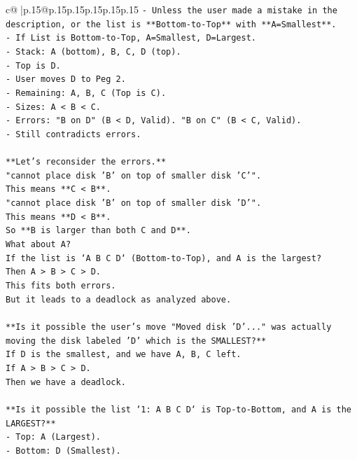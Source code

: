 \documentclass{article}
\begin{document}
{\begin{supertabular}{c@{$\;$}|p{.15\linewidth}@{}p{.15\linewidth}p{.15\linewidth}p{.15\linewidth}p{.15\linewidth}p{.15\linewidth}}
{{{\texttt{{-} Unless the user made a mistake in the description, or the list is **Bottom{-}to{-}Top** with **A=Smallest**.} \\
\texttt{{-} If List is Bottom{-}to{-}Top, A=Smallest, D=Largest.} \\
\texttt{{-} Stack: A (bottom), B, C, D (top).} \\
\texttt{{-} Top is D.} \\
\texttt{{-} User moves D to Peg 2.} \\
\texttt{{-} Remaining: A, B, C (Top is C).} \\
\texttt{{-} Sizes: A < B < C.} \\
\texttt{{-} Errors: "B on D" (B < D, Valid). "B on C" (B < C, Valid).} \\
\texttt{{-} Still contradicts errors.} \\
\\ 
\texttt{**Let's reconsider the errors.**} \\
\texttt{"cannot place disk 'B' on top of smaller disk 'C'".} \\
\texttt{This means **C < B**.} \\
\texttt{"cannot place disk 'B' on top of smaller disk 'D'".} \\
\texttt{This means **D < B**.} \\
\texttt{So **B is larger than both C and D**.} \\
\texttt{What about A?} \\
\texttt{If the list is `A B C D` (Bottom{-}to{-}Top), and A is the largest?} \\
\texttt{Then A > B > C > D.} \\
\texttt{This fits both errors.} \\
\texttt{But it leads to a deadlock as analyzed above.} \\
\\ 
\texttt{**Is it possible the user's move "Moved disk 'D'..." was actually moving the disk labeled 'D' which is the SMALLEST?**} \\
\texttt{If D is the smallest, and we have A, B, C left.} \\
\texttt{If A > B > C > D.} \\
\texttt{Then we have a deadlock.} \\
\\ 
\texttt{**Is it possible the list `1: A B C D` is Top{-}to{-}Bottom, and A is the LARGEST?**} \\
\texttt{{-} Top: A (Largest).} \\
\texttt{{-} Bottom: D (Smallest).} \\
}}}
\end{supertabular}}
\end{document}
